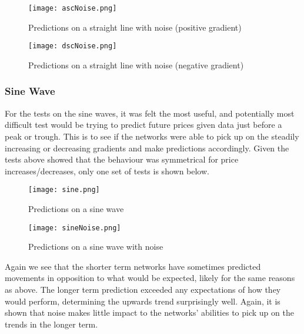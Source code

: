             \begin{figure}[htbp]
                \centering
                \texttt{[image: ascNoise.png]}
                \caption{Predictions on a straight line with noise (positive gradient)}
                \label{fig:ascNoise}
            \end{figure}

            \begin{figure}[htbp]
                \centering
                \texttt{[image: dscNoise.png]}
                \caption{Predictions on a straight line with noise (negative gradient)}
                \label{fig:dscNoise}
            \end{figure}

            \newpage
            \subsubsection{Sine Wave}
            For the tests on the sine waves, it was felt the most useful, and potentially most difficult test would be trying to predict future prices given data just before a peak or trough. This is to see if the networks were able to pick up on the steadily increasing or decreasing gradients and make predictions accordingly. Given the tests above showed that the behaviour was symmetrical for price increases/decreases, only one set of tests is shown below.

            \begin{figure}[htbp]
                \centering
                \texttt{[image: sine.png]}
                \caption{Predictions on a sine wave}
                \label{fig:sine}
            \end{figure}

            \begin{figure}[htbp]
                \centering
                \texttt{[image: sineNoise.png]}
                \caption{Predictions on a sine wave with noise}
                \label{fig:sineNoise}
            \end{figure}

            Again we see that the shorter term networks have sometimes predicted movements in opposition to what would be expected, likely for the same reasons as above. The longer term prediction exceeded any expectations of how they would perform, determining the upwards trend surprisingly well. Again, it is shown that noise makes little impact to the networks' abilities to pick up on the trends in the longer term.

